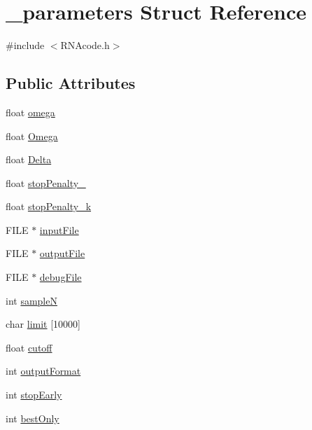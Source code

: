 \hypertarget{struct__parameters}{}\section{\+\_\+parameters Struct Reference}
\label{struct__parameters}


{\ttfamily \#include $<$R\+N\+Acode.\+h$>$}

\subsection*{Public Attributes}
\begin{DoxyCompactItemize}
\item 
float \hyperlink{struct__parameters_a8f69e384c5cc468de9c3c527bd9a3722}{omega}
\item 
float \hyperlink{struct__parameters_ab9173ba4e45a417ed8e7317699b5c77c}{Omega}
\item 
float \hyperlink{struct__parameters_a9a5b85aa0c04d7e22e824e315b14e4cd}{Delta}
\item 
float \hyperlink{struct__parameters_a35c6c83856e4256be0fb543410014f1e}{stop\+Penalty\+\_}
\item 
float \hyperlink{struct__parameters_ae26af9c558d90b735b7ed5c2bb8bbb1b}{stop\+Penalty\+\_\+k}
\item 
F\+I\+LE $\ast$ \hyperlink{struct__parameters_a37a15ced629242ecdf8a8ccf9f49d81b}{input\+File}
\item 
F\+I\+LE $\ast$ \hyperlink{struct__parameters_a683e0de09c9d45e219db06753f89bc7e}{output\+File}
\item 
F\+I\+LE $\ast$ \hyperlink{struct__parameters_ab616c6d418c255985ac50a9311d8c26a}{debug\+File}
\item 
int \hyperlink{struct__parameters_a40706f4d64be0c9ee5cb411cee949416}{sampleN}
\item 
char \hyperlink{struct__parameters_ab9f7cf2359b590f2476fff80a85aff43}{limit} \mbox{[}10000\mbox{]}
\item 
float \hyperlink{struct__parameters_a6e3ed4fee9836ba83e10f42a0b9d89b2}{cutoff}
\item 
int \hyperlink{struct__parameters_a37dadb0f3fa7deca9cdc43797cc0ff5b}{output\+Format}
\item 
int \hyperlink{struct__parameters_ad170b87fd49f42a1ca464c93e36fa0e3}{stop\+Early}
\item 
int \hyperlink{struct__parameters_acdebd1fac8029bad117f9ba82bef93d5}{best\+Only}
\item 

\end{DoxyCompactItemize}
